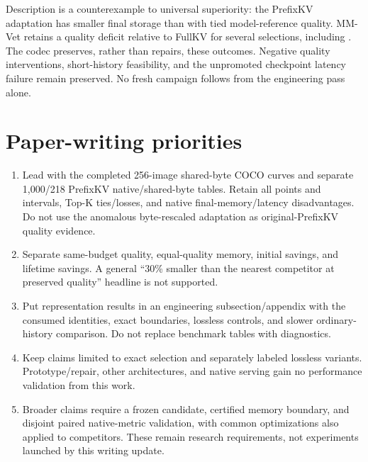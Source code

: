 Description is a counterexample to universal superiority: the PrefixKV
adaptation has smaller final storage than \Evi{} with tied model-reference
quality. MM-Vet retains a quality deficit relative to FullKV for several
selections, including \Evi{}. The codec preserves, rather than repairs,
these outcomes. Negative quality interventions, short-history feasibility,
and the unpromoted checkpoint latency failure remain preserved. No fresh
campaign follows from the engineering pass alone.

\section{Paper-writing priorities}
\label{sec:writingactions}
\begin{enumerate}
\item Lead with the completed 256-image shared-byte COCO curves and separate
1,000/218 PrefixKV native/shared-byte tables. Retain all points and intervals,
Top-K ties/losses, and native final-memory/latency disadvantages. Do not use
the anomalous byte-rescaled adaptation as original-PrefixKV quality evidence.
\item Separate same-budget quality, equal-quality memory, initial savings,
and lifetime savings. A general ``30\% smaller than the nearest competitor
at preserved quality'' headline is not supported.
\item Put representation results in an engineering subsection/appendix with
the consumed identities, exact boundaries, lossless controls, and slower
ordinary-history comparison. Do not replace benchmark tables with diagnostics.
\item Keep claims limited to exact selection and separately labeled lossless
variants. Prototype/repair, other architectures, and native serving gain no
performance validation from this work.
\item Broader claims require a frozen candidate, certified memory boundary,
and disjoint paired native-metric validation, with common optimizations also
applied to competitors. These remain research requirements, not experiments
launched by this writing update.
\end{enumerate}
